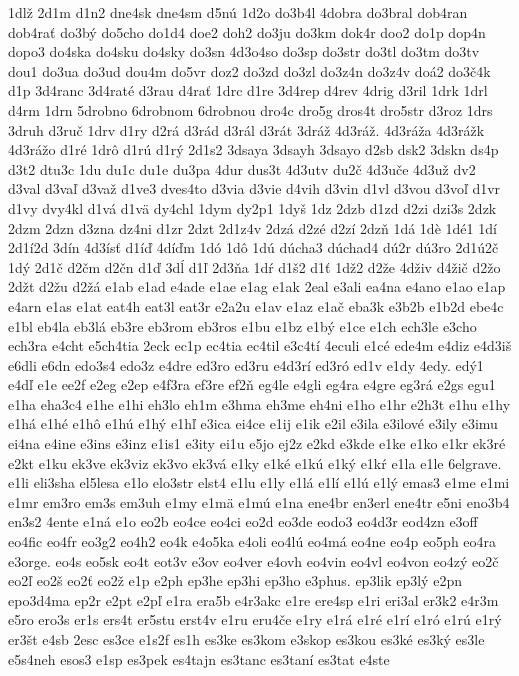 {1dlž
2d1m
d1n2
dne4sk
dne4sm
d5nú
1d2o
do3b4l
4dobra
do3bral
dob4ran
dob4rať
do3bý
do5cho
do1d4
doe2
doh2
do3ju
do3km
dok4r
doo2
do1p
dop4n
dopo3
do4ska
do4sku
do4sky
do3sn
4d3o4so
do3sp
do3str
do3tl
do3tm
do3tv
dou1
do3ua
do3ud
dou4m
do5vr
doz2
do3zd
do3zl
do3z4n
do3z4v
doá2
do3č4k
d1p
3d4ranc
3d4raté
d3rau
d4rať
1drc
d1re
3d4rep
d4rev
4drig
d3ril
1drk
1drl
d4rm
1drn
5drobno
6drobnom
6drobnou
dro4c
dro5g
dros4t
dro5str
d3roz
1drs
3druh
d3ruč
1drv
d1ry
d2rá
d3rád
d3rál
d3rát
3dráž
4d3ráž.
4d3ráža
4d3rážk
4d3rážo
d1ré
1drô
d1rú
d1rý
2d1s2
3dsaya
3dsayh
3dsayo
d2sb
dsk2
3dskn
ds4p
d3t2
dtu3c
1du
du1c
du1e
du3pa
4dur
dus3t
4d3utv
du2č
4d3uče
4d3už
dv2
d3val
d3vaľ
d3važ
d1ve3
dves4to
d3via
d3vie
d4vih
d3vin
d1vl
d3vou
d3voľ
d1vr
d1vy
dvy4kl
d1vá
d1vä
dy4chl
1dym
dy2p1
1dyš
1dz
2dzb
d1zd
d2zi
dzi3s
2dzk
2dzm
2dzn
d3zna
dz4ni
d1zr
2dzt
2d1z4v
2dzá
d2zé
d2zí
2dzň
1dá
1dè
1dé1
1dí
2d1í2d
3dín
4d3ísť
d1íď
4díďm
1dó
1dô
1dú
dúcha3
dúchad4
dú2r
dú3ro
2d1ú2č
1dý
2d1č
d2čm
d2čn
d1ď
3dĺ
d1ľ
2d3ňa
1dŕ
d1š2
d1ť
1dž2
d2že
4dživ
d4žič
d2žo
2džt
d2žu
d2žá
e1ab
e1ad
e4ade
e1ae
e1ag
e1ak
2eal
e3ali
ea4na
e4ano
e1ao
e1ap
e4arn
e1as
e1at
eat4h
eat3l
eat3r
e2a2u
e1av
e1az
e1ač
eba3k
e3b2b
e1b2d
ebe4c
e1bl
eb4la
eb3lá
eb3re
eb3rom
eb3ros
e1bu
e1bz
e1bý
e1ce
e1ch
ech3le
e3cho
ech3ra
e4cht
e5ch4tia
2eck
ec1p
ec4tia
ec4til
e3c4tí
4eculi
e1cé
ede4m
e4diz
e4d3iš
e6dli
e6dn
edo3s4
edo3z
e4dre
ed3ro
ed3ru
e4d3rí
ed3ró
ed1v
e1dy
4edy.
edý1
e4dľ
e1e
ee2f
e2eg
e2ep
e4f3ra
ef3re
ef2ň
eg4le
e4gli
eg4ra
e4gre
eg3rá
e2gs
egu1
e1ha
eha3c4
e1he
e1hi
eh3lo
eh1m
e3hma
eh3me
eh4ni
e1ho
e1hr
e2h3t
e1hu
e1hy
e1há
e1hé
e1hô
e1hú
e1hý
e1hľ
e3ica
ei4ce
e1ij
e1ik
e2il
e3ila
e3ilové
e3ily
e3imu
ei4na
e4ine
e3ins
e3inz
e1is1
e3ity
ei1u
e5jo
ej2z
e2kd
e3kde
e1ke
e1ko
e1kr
ek3ré
e2kt
e1ku
ek3ve
ek3viz
ek3vo
ek3vá
e1ky
e1ké
e1kú
e1ký
e1kŕ
e1la
e1le
6elgrave.
e1li
eli3sha
el5lesa
e1lo
elo3str
elst4
e1lu
e1ly
e1lá
e1lí
e1lú
e1lý
emas3
e1me
e1mi
e1mr
em3ro
em3s
em3uh
e1my
e1mä
e1mú
e1na
ene4br
en3erl
ene4tr
e5ni
eno3b4
en3s2
4ente
e1ná
e1o
eo2b
eo4ce
eo4ci
eo2d
eo3de
eodo3
eo4d3r
eod4zn
e3off
eo4fic
eo4fr
eo3g2
eo4h2
eo4k
e4o5ka
e4oli
eo4lú
eo4má
eo4ne
eo4p
eo5ph
eo4ra
e3orge.
eo4s
eo5sk
eo4t
eot3v
e3ov
eo4ver
e4ovh
eo4vin
eo4vl
eo4von
eo4zý
eo2č
eo2ľ
eo2š
eo2ť
eo2ž
e1p
e2ph
ep3he
ep3hi
ep3ho
e3phus.
ep3lik
ep3lý
e2pn
epo3d4ma
ep2r
e2pt
e2pľ
e1ra
era5b
e4r3akc
e1re
ere4sp
e1ri
eri3al
er3k2
e4r3m
e5ro
ero3s
er1s
ers4t
er5stu
erst4v
e1ru
eru4če
e1ry
e1rá
e1ré
e1rí
e1ró
e1rú
e1rý
er3št
e4sb
2esc
es3ce
e1s2f
es1h
es3ke
es3kom
e3skop
es3kou
es3ké
es3ký
es3le
e5s4neh
esos3
e1sp
es3pek
es4tajn
es3tanc
es3taní
es3tat
e4ste
}
